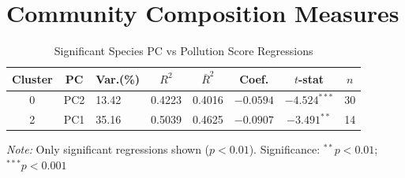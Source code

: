 \chapter{Community Composition Measures}


\begin{table}[htbp]
    \centering
    \caption{Significant Species PC vs Pollution Score Regressions}
    \label{tab:04_pc_pollution_regression}
    \small
    \begin{tabular}{cclccccc}
        \toprule
        \textbf{Cluster} & \textbf{PC} & \textbf{Var.(\%)} & \textbf{$R^2$} & \textbf{$\bar{R}^2$} & \textbf{Coef.} & \textbf{$t$-stat} & \textbf{$n$} \\
        \midrule
        0 & PC2 & 13.42 & 0.4223 & 0.4016 & $-0.0594$ & $-4.524^{***}$ & 30 \\
        2 & PC1 & 35.16 & 0.5039 & 0.4625 & $-0.0907$ & $-3.491^{**}$ & 14 \\
        \bottomrule
    \end{tabular}
    
    \vspace{0.5em}
    \footnotesize
    \textit{Note:} Only significant regressions shown ($p < 0.01$).
    Significance: $^{**}p < 0.01$; $^{***}p < 0.001$
\end{table}


